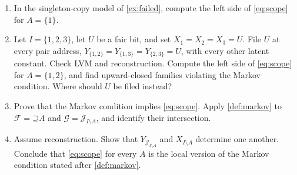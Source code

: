\documentclass[11pt]{article}
\newcommand{\Up}{\mathord{\supseteq}}
\begin{document}
\begin{exercise}
\label{ex:scope}\important
\begin{enumerate}
\item In the singleton-copy model of \cref{ex:failed}, compute the left side
of \eqref{eq:scope} for $A=\{1\}$.
\item Let $I=\{1,2,3\}$, let $U$ be a fair bit, and set $X_1=X_2=X_3=U$. File
$U$ at every pair address, $Y_{\{1,2\}}=Y_{\{1,3\}}=Y_{\{2,3\}}=U$, with every
other latent constant. Check LVM and reconstruction. Compute the left side of
\eqref{eq:scope} for $A=\{1,2\}$, and find upward-closed families violating
the Markov condition. Where should $U$ be filed instead?
\item Prove that the Markov condition implies \eqref{eq:scope}. Apply
\cref{def:markov} to $\mathcal{F}=\Up A$ and $\mathcal{G}=\mathcal{J}_{I\setminus A}$,
and identify their intersection.
\item Assume reconstruction. Show that $Y_{\mathcal{J}_{I\setminus A}}$ and
$X_{I\setminus A}$ determine one another. Conclude that \eqref{eq:scope} for
every $A$ is the local version of the Markov condition stated after
\cref{def:markov}.
\end{enumerate}
\end{exercise}
\end{document}
